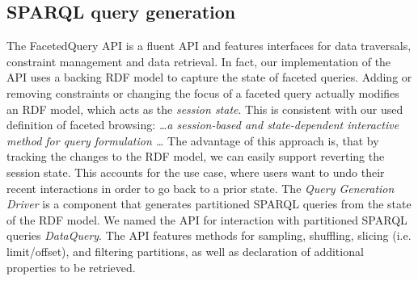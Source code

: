 \subsection{SPARQL query generation}
The FacetedQuery API is a fluent API and features interfaces for data traversals, constraint management and data retrieval.
In fact, our implementation of the API uses a backing RDF model to capture the state of faceted queries.
Adding or removing constraints or changing the focus of a faceted query actually modifies an RDF model, which acts as the \emph{session state}.
This is consistent with our used definition of faceted browsing: \emph{\ldots a session-based and state-dependent interactive method for query formulation \ldots}
The advantage of this approach is, that by tracking the changes to the RDF model, we can easily support
reverting the session state. This accounts for the use case, where users want to undo their recent interactions in order to go back to a prior state.
The \emph{Query Generation Driver} is a component that generates partitioned SPARQL queries from the state of the RDF model.
We named the API for interaction with partitioned SPARQL queries \emph{DataQuery}.
The API features methods for sampling, shuffling, slicing (i.e. limit/offset), and filtering partitions,
as well as declaration of additional properties to be retrieved.




